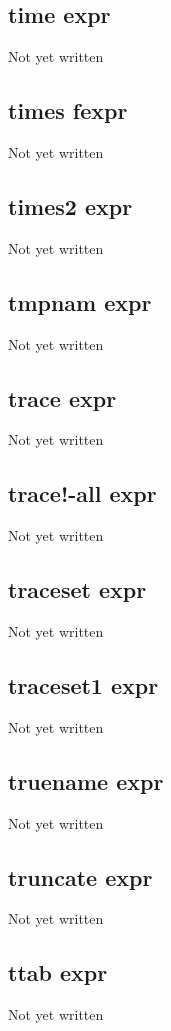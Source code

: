 \documentclass[a4paper,11pt]{article}
\begin{document}
{\subsection{\ttfamily time expr}
Not yet written

\subsection{\ttfamily times fexpr}
Not yet written

\subsection{\ttfamily times2 expr}
Not yet written

\subsection{\ttfamily tmpnam expr}
Not yet written

\subsection{\ttfamily trace expr}
Not yet written

\subsection{\ttfamily trace!-all expr}
Not yet written

\subsection{\ttfamily traceset expr}
Not yet written

\subsection{\ttfamily traceset1 expr}
Not yet written

\subsection{\ttfamily truename expr}
Not yet written

\subsection{\ttfamily truncate expr}
Not yet written

\subsection{\ttfamily ttab expr}
Not yet written

}
\end{document}
